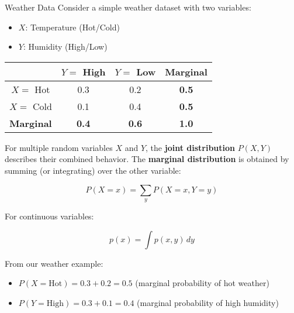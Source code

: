 \begin{examplebox}{Weather Data}
Consider a simple weather dataset with two variables:
\begin{itemize}
    \item $X$: Temperature (Hot/Cold)
    \item $Y$: Humidity (High/Low)
\end{itemize}

\begin{center}
\begin{tabular}{|c|c|c|c|}
\hline
 & $Y=$ High & $Y=$ Low & \textbf{Marginal} \\
\hline
$X=$ Hot & 0.3 & 0.2 & \textbf{0.5} \\
$X=$ Cold & 0.1 & 0.4 & \textbf{0.5} \\
\hline
\textbf{Marginal} & \textbf{0.4} & \textbf{0.6} & \textbf{1.0} \\
\hline
\end{tabular}
\end{center}

For multiple random variables $X$ and $Y$, the \textbf{joint distribution} $P(X, Y)$ describes their combined behavior. The \textbf{marginal distribution} is obtained by summing (or integrating) over the other variable:

\begin{equation}
P(X=x) = \sum_{y} P(X=x, Y=y)
\end{equation}

For continuous variables:

\begin{equation}
p(x) = \int p(x, y) \, dy
\end{equation}

From our weather example:
\begin{itemize}
    \item $P(X=\text{Hot}) = 0.3 + 0.2 = 0.5$ (marginal probability of hot weather)
    \item $P(Y=\text{High}) = 0.3 + 0.1 = 0.4$ (marginal probability of high humidity)
\end{itemize}
\end{examplebox}
